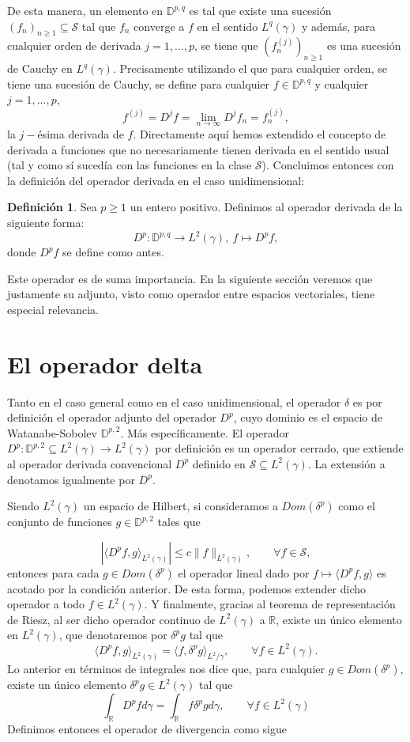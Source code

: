 \documentclass[letterpaper,twoside,12pt]{book}
\newcommand{\R}{\mathbb{R}}
\newcommand{\1}{\mathds{1}}
\newcommand{\abs}[1]{\left\lvert #1 \right\rvert}
\renewcommand{\to}{\rightarrow}
\theoremstyle{definition}
\newtheorem{dfn}{Definición}
\theoremstyle{definition}
\theoremstyle{definition}
\theoremstyle{definition}
\theoremstyle{definition}
\theoremstyle{definition}
\theoremstyle{definition}
\begin{document}
De esta manera, un elemento en $\mathbb{D}^{p,q}$ es tal que existe una sucesión $(f_n)_{n\geq1}\subseteq \mathcal{S}$ tal que $f_n$ converge a $f$ en el sentido $L^{q}(\gamma)$ y además, para cualquier orden de derivada $j=1,...,p$, se tiene que $(f_n^{(j)})_{n\geq1}$ es una sucesión de Cauchy en $L^{q}(\gamma)$. Precisamente utilizando el que para cualquier orden, se tiene una sucesión de Cauchy, se define para cualquier $f\in \mathbb{D}^{p,q}$ y cualquier $j=1,...,p$, 
\[
f^{(j)}=D^jf=\lim_{n\to\infty}D^{j}f_n=f_n^{(j)},
\]
la $j-$ésima derivada de $f$. Directamente aquí hemos extendido el concepto de derivada a funciones que no necesariamente tienen derivada en el sentido usual (tal y como sí sucedía con las funciones en la clase $\mathcal{S}$). Concluimos entonces con la definición del operador derivada en el caso unidimensional:
\begin{dfn}
    Sea $p\geq1$ un entero positivo. Definimos al operador derivada de la siguiente forma: 
    \[
    D^p:\mathbb{D}^{p,q}\longrightarrow L^{2}(\gamma), \ f\longmapsto D^{p}f,    
    \]
    donde $D^{p}f$ se define como antes. 
\end{dfn}
Este operador es de suma importancia. En la siguiente sección veremos que justamente su adjunto, visto como operador entre espacios vectoriales, tiene especial relevancia.



\section{El operador delta}

Tanto en el caso general como en el caso unidimensional, el operador $\delta$ es por definición el operador adjunto del operador $D^{p}$, cuyo dominio es el espacio de Watanabe-Sobolev $\mathbb{D}^{p,2}$. Más específicamente. El operador $D^{p}:\mathbb{D}^{p,2}\subseteq L^2(\gamma)\longrightarrow L^2(\gamma)$ por definición es un operador cerrado, que extiende al operador derivada convencional $D^{p}$ definido en $\mathcal{S}\subseteq L^2(\gamma)$. La extensión a denotamos igualmente por $D^{p}.$

Siendo $L^{2}(\gamma)$ un espacio de Hilbert, si consideramos a $Dom(\delta^{p})$ como el conjunto de funciones $g\in \mathbb{D}^{p,2}$ tales que

\[
\abs{\langle D^{p}f,g\rangle_{L^2(\gamma)}}\leq c\|f\|_{L^2(\gamma)}, \qquad \forall f\in \mathcal{S},
\]
entonces para cada $g\in Dom(\delta^{p})$ el operador lineal dado por $f\longmapsto \langle D^{p}f,g\rangle$ es acotado por la condición anterior. De esta forma, podemos extender dicho operador a todo $f\in L^2(\gamma)$. Y finalmente, gracias al teorema de representación de Riesz, al ser dicho operador continuo de $L^{2}(\gamma) $ a $\R$, existe un único elemento en $L^2(\gamma)$, que denotaremos por $\delta^{p}g$ tal que 
\[
\langle D^pf,g\rangle_{L^2(\gamma)}=\langle f,\delta^p g\rangle_{L^2/\gamma}, \qquad \forall f\in L^2(\gamma).
\]
 Lo anterior en términos de integrales nos dice que, para cualquier $g\in Dom(\delta^p)$, existe un único elemento $\delta^p g\in L^2(\gamma)$ tal que 
 \[
  \int_\R D^{p}fd\gamma=\int_\R f\delta^{p}gd\gamma, \qquad \forall f\in L^2(\gamma)  
 \]
 Definimos entonces el operador de divergencia como sigue
\end{document}
